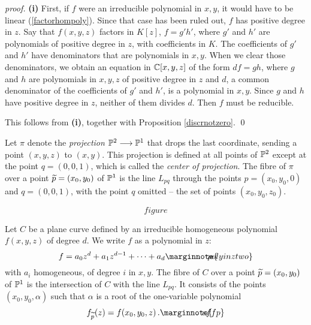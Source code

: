 \documentclass[leqno]{book}
\newcommand\Marginnote[1]{\marginnote{\hspace{-12pt}\normalfont{#1}}}
\theoremstyle{definition}%
\numberwithin{equation}{section}
\theoremstyle{theorem} %
\renewenvironment{proof}{\no \emph{proof.}}{}
\begin{document}
\begin{proof}
{\bf (i)} First, if $f$ were an irreducible polynomial in $x,y$, it
would have to be linear (\ref{factorhompoly}).  Since that case has been
ruled out, $f$ has positive degree in $z$.  Say that $f(x,y,z)$
factors in $K[z]$, $f = g'h'$, where $g'$ and $h'$ are polynomials of
positive degree in $z$, with coefficients in $K$.  The coefficients of
$g'$ and $h'$ have denominators that are polynomials in $x,y$.  When
we clear those denominators, we obtain an equation in $\mathbb{C}[x,y,z]$ of
the form $df=gh$, where $g$ and $h$ are polynomials in $x,y,z$ of
positive degree in $z$ and $d$, a common denominator of the
coefficients of $g'$ and $h'$, is a polynomial in $x,y$.  Since $g$
and $h$ have positive degree in $z$, neither of them divides $d$. Then
$f$ must be reducible.

 This follows from {\bf (i)}, together with
Proposition \ref{discrnotzero}.
\qed\end{proof}

\bs Let $\pi$ denote the {\it projection} $\mathbb{P}^2 \longrightarrow
\mathbb{P}^1$ that drops the last coordinate, sending a point $(x,y,z)$ to
$(x,y)$.  This projection is defined at all points of $\mathbb{P}^2$ except
at the point $q= (0,0,1)$, which is called the {\it center
  of projection}.  The fibre of $\pi$ over a point $\widetilde p=(x_0,y_0)$ of
$\mathbb{P}^1$ is the line $L_{pq}$ through the points $p=(x_0,y_0,0)$ and
$q=(0,0,1)$, with the point $q$ omitted -- the set of points
$(x_0,y_0,z_0)$.

$$figure$$

Let $C$ be a plane curve defined by an irreducible homogeneous
polynomial $f(x,y,z)$ of degree $d$.
  We write $f$ as a polynomial in $z$:
\begin{equation}
f = a_0z^d+a_1z^{d-1} + \cdots + a_d\Marginnote{polyinztwo}
\label{polyinztwo}
\end{equation} 
with $a_i$ homogeneous, of degree $i$ in $x,y$.
 The 
  fibre of $C$ over a point $\widetilde p = (x_0,y_0)$ of $\mathbb{P}^1$ is the
intersection of $C$ with the line $L_{pq}$.  It
consists of the points $(x_0,y_0,\alpha)$ such that $\alpha$ is a root
of the one-variable polynomial
\begin{equation}
f_{\tp}(z) = f(x_0,y_0,z)\,.\Marginnote{effp}	\label{effp}
\end{equation} 
\end{document}
